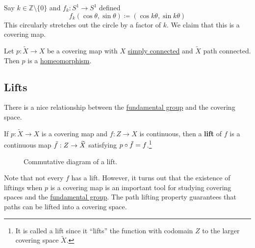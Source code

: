   \begin{example}
    \label{ex:degree-k-self-maps-of-the-circle}
    Say $k \in \mathbb{Z} \setminus \{0\}$ and $f_k : S^1 \to S^1$ defined 
    \begin{equation}
      f_k (\cos{\theta}, \sin{\theta}) \coloneqq (\cos{k \theta}, \sin{k\theta})
    \end{equation}
    This circularly stretches out the circle by a factor of $k$. We claim that this is a covering map. 
  \end{example}

  \begin{theorem}
    \label{thm:covering-maps-as-homeomorphisms}
    Let $p: \widetilde{X} \to X$ be a covering map with $X$ \hyperref[def:simply-connected]{simply connected} and $\widetilde{X}$ path connected. Then $p$ is a \hyperref[pst-def:homeomorphism]{homeomorphism}.
  \end{theorem}

\subsection{Lifts}
  
  There is a nice relationship between the \hyperref[def:fundamental-group]{fundamental group} and the covering space. 

  \begin{definition}[Lift]
    \label{def:lift}
    If $p: \widetilde{X} \to X$ is a covering map and $f: Z \to X$ is continuous, then a \textbf{lift} of $f$ is a continuous map $\Tilde{f}: Z \to \widetilde{X}$ satisfying $p \circ \Tilde{f} = f$.\footnote{It is called a lift since it ``lifts'' the function with codomain $Z$ to the larger covering space $\widetilde{X}$.}

    \begin{figure}[H]
      \centering 
      \caption{Commutative diagram of a lift.} 
      \label{fig:lift}
    \end{figure}
  \end{definition}

  Note that not every $f$ has a lift. However, it turns out that the existence of liftings when $p$ is a covering map is an important tool for studying covering spaces and the \hyperref[def:fundamental-group]{fundamental group}. The path lifting property guarantees that paths can be lifted into a covering space. 

